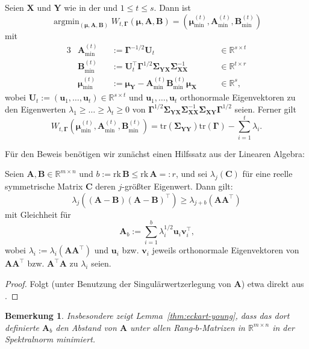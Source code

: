 \documentclass[]{article}
\newcommand{\R}{\mathbb{R}}
\newcommand{\X}{\mathbf{X}}
\newcommand{\Y}{\mathbf{Y}}
\newcommand{\muu}{\bm{\mu}}
\newcommand{\Ssigma}{\mathbf{\Sigma}}
\newcommand{\uu}{\mathbf{u}}
\newcommand{\C}{\mathbf{C}}
\newcommand{\rk}{\mathrm{rk}}
\newcommand{\A}{\mathbf{A}}
\newcommand{\B}{\mathbf{B}}
\newcommand{\Ggamma}{\mathbf{\Gamma}}
\newcommand{\tr}{\mathrm{tr}}
\newtheorem*{remark}{Bemerkung}
\DeclareMathOperator*{\argmin}{argmin}
\begin{document}
\begin{theorem}
	\label{thm:rrr}
	Seien $\X$ und $\Y$ wie in der  und $1 \leq t \leq s$. Dann ist
	$$\argmin_{(\muu, \A, \B)} W_{t, \Ggamma}(\muu, \A, \B) = (\muu^{(t)}_{\min}, \A^{(t)}_{\min}, \B^{(t)}_{\min})$$ mit
	\begin{alignat*}{3}
		&\A^{(t)}_{\min}   &&:= \Ggamma^{-1/2} \mathbf{U}_t                                       &&\quad \in \R^{s \times t} \\
		&\B^{(t)}_{\min}   &&:= \mathbf{U}_t^\top \Ggamma^{1/2} \Ssigma_{\Y\X}\Ssigma_{\X\X}^{-1} &&\quad \in \R^{t \times r} \\
		&\muu^{(t)}_{\min} &&:= \muu_\Y - \A^{(t)}_{\min} \B^{(t)}_{\min} \muu_\X                 &&\quad \in \R^s \text{,}
	\end{alignat*}
	wobei $\mathbf{U}_t := (\uu_1,\dots, \uu_t) \in \R^{s \times t}$ und $\uu_1,\dots, \uu_t$ orthonormale Eigenvektoren zu den Eigenwerten $\lambda_1 \geq \dots \geq \lambda_t \geq 0$ von $\Ggamma^{1/2} \Ssigma_{\Y\X} \Ssigma_{\X\X}^{-1} \Ssigma_{\X\Y} \Ggamma^{1/2}$ seien.
	Ferner gilt
	$$W_{t, \Ggamma}(\muu^{(t)}_{\min}, \A^{(t)}_{\min}, \B^{(t)}_{\min}) = \tr(\Ssigma_{\Y\Y}) \tr(\Ggamma) - \sum_{i=1}^{t} \lambda_i \text{.}$$
\end{theorem}

Für den Beweis benötigen wir zunächst einen Hilfssatz aus der Linearen Algebra:

\begin{lemma}
	\label{thm:eckart-young}
	Seien $\A, \B \in \R^{m \times n}$ und $b := \rk \, \B \leq \rk \, \A =: r$, und sei
	$\lambda_j(\C)$ für eine reelle symmetrische Matrix $\C$ deren $j$-größter Eigenwert.
	Dann gilt:
	$$\lambda_j((\A - \B)(\A - \B)^\top) \geq \lambda_{j+b}(\A \A^\top)$$
	mit Gleichheit für
	$$\A_b := \sum_{i=1}^{b} \lambda_i^{1/2} \mathbf{u}_i \mathbf{v}_i^\top \text{,}$$
	wobei $\lambda_i := \lambda_i(\A \A^\top)$ und $\mathbf{u}_i$ bzw. $\mathbf{v}_i$ jeweils orthonormale Eigenvektoren von $\A \A^\top$ bzw. 
	$\A^\top \A$ zu $\lambda_i$ seien.
\end{lemma}

\begin{proof}
	Folgt (unter Benutzung der Singulärwertzerlegung von $\A$) etwa direkt aus \cite[Satz 4.6]{BZ21}.
\end{proof}

\begin{remark}
	\normalfont
	Insbesondere zeigt Lemma~\ref{thm:eckart-young}, dass das dort definierte $\A_b$ den Abstand von $\A$ unter allen Rang-$b$-Matrizen in $\R^{m \times n}$ in der Spektralnorm minimiert.
\end{remark}
\end{document}
